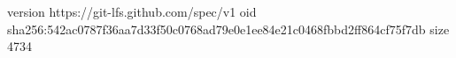 version https://git-lfs.github.com/spec/v1
oid sha256:542ac0787f36aa7d33f50c0768ad79e0e1ee84e21c0468fbbd2ff864cf75f7db
size 4734
